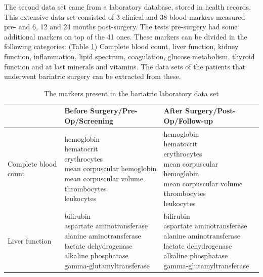 \documentclass[10pt,a4paper]{report}
\begin{document}
	The second data set came from a laboratory database, stored in health records. This extensive data set consisted of 3 clinical and 38 blood markers measured pre- and 6, 12 and 24 months post-surgery. The tests pre-surgery had some additional markers on top of the 41 ones. These markers can be divided in the following categories: (Table \ref{tab:DataMarkers}) Complete blood count, liver function, kidney function, inflammation, lipid spectrum, coagulation, glucose metabolism, thyroid function and at last minerals and vitamins. The data sets of the patients that underwent bariatric surgery can be extracted from these. 
	
	\begin{table}
		\label{tab:DataMarkers}
		\caption{The markers present in the bariatric laboratory data set \cite{Deneer2017Thesis}}
		\begin{tabular}{lll}
			\hline
			~                     & Before Surgery/Pre-Op/Screening                                                                                                                     & After Surgery/Post-Op/Follow-up                                                                                                                     \\ \hline
			Complete blood count  & \makecell{hemoglobin\\hematocrit\\erythrocytes\\mean corpuscular hemoglobin\\mean corpuscular volume\\thrombocytes\\leukocytes}                                & \makecell{hemoglobin\\hematocrit\\erythrocytes\\mean corpuscular hemoglobin\\mean corpuscular volume\\thrombocytes\\leukocytes}                                \\ \hline
			Liver function        & \makecell{bilirubin\\aspartate aminotransferase\\alanine aminotransferase\\lactate dehydrogenase\\alkaline phosphatase\\gamma-glutamyltransferase}             & \makecell{bilirubin\\aspartate aminotransferase\\alanine aminotransferase\\lactate dehydrogenase\\alkaline phosphatase\\gamma-glutamyltransferase}             \\ \hline

\end{tabular}
\end{table}
\end{document}
